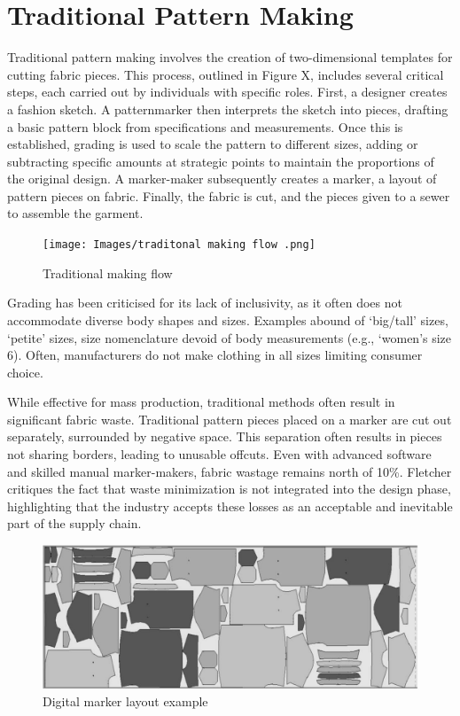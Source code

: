 \section{Traditional Pattern Making}
Traditional pattern making involves the creation of two-dimensional templates for cutting fabric pieces. This process, outlined in Figure X, includes several critical steps, each carried out by individuals with specific roles. First, a designer creates a fashion sketch. A patternmarker then interprets the sketch into pieces, drafting a basic pattern block from specifications and measurements. Once this is established, grading is used to scale the pattern to different sizes, adding or subtracting specific amounts at strategic points to maintain the proportions of the original design. A marker-maker subsequently creates a marker, a layout of pattern pieces on fabric. Finally, the fabric is cut, and the pieces given to a sewer to assemble the garment.
\begin{figure} [H]
    \centering
    \texttt{[image: Images/traditonal making flow .png]}
    \caption{Traditional making flow}
\end{figure}
Grading has been criticised for its lack of inclusivity, as it often does not accommodate diverse body shapes and sizes. Examples abound of ‘big/tall’ sizes, ‘petite’ sizes, size nomenclature devoid of body measurements (e.g., ‘women’s size 6). Often, manufacturers do not make clothing in all sizes limiting consumer choice.

While effective for mass production, traditional methods often result in significant fabric waste. Traditional pattern pieces placed on a marker are cut out separately, surrounded by negative space. This separation often results in pieces not sharing borders, leading to unusable offcuts.  Even with advanced software and skilled manual marker-makers, fabric wastage remains north of 10\%. Fletcher critiques the fact that waste minimization is not integrated into the design phase, highlighting that the industry accepts these losses as an acceptable and inevitable part of the supply chain.
\begin{figure} [H]
    \centering
    \includegraphics[width=\textwidth]{Images/digital marker layout.png}
    \caption{Digital marker layout example}
\end{figure}

